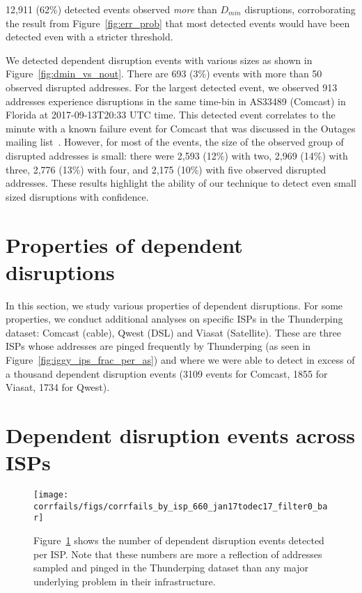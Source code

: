12,911 (62\%) detected events observed \emph{more} than $D_{min}$
disruptions, corroborating the result from Figure~\ref{fig:err_prob}
that most detected events would have been detected even with a
stricter threshold. 

We detected dependent disruption events with various sizes as shown in
Figure~\ref{fig:dmin_vs_nout}. There are
693 (3\%) events with more than 50 observed disrupted addresses. For the largest
detected event, we observed 913 addresses experience disruptions in
the same time-bin in AS33489 (Comcast) in
Florida at 2017-09-13T20:33 UTC time. This detected event correlates
to the minute with a known failure event for Comcast
that was discussed in the Outages mailing list~\cite{comcast-sep-13-2017-large-outage-mailinglist}. However, for most of the events, the size of the observed
group of disrupted addresses is small: there were 2,593 (12\%)
with two, 2,969 (14\%) with three, 2,776 (13\%) with four, and 2,175
(10\%) with five observed disrupted addresses. These results highlight the
ability of our technique to detect even small sized disruptions with
confidence.


\section{Properties of dependent disruptions}

In this section, we study various properties of dependent
disruptions. For some properties, we conduct additional analyses on
specific ISPs in the Thunderping dataset: Comcast (cable), Qwest (DSL)
and Viasat (Satellite). These are three ISPs whose addresses are
pinged frequently by Thunderping (as seen in
Figure~\ref{fig:iggy_ips_frac_per_as})
and where we were able to
detect in excess of a thousand dependent disruption events (3109
events for Comcast, 1855 for Viasat, 1734 for Qwest).

\section{Dependent disruption events across ISPs}

\label{sec:corrfails_by_isp}


\begin{figure}[t]
\centering
\texttt{[image: corrfails/figs/corrfails\_by\_isp\_660\_jan17todec17\_filter0\_bar]}
\caption[Dependent disruption events detected per ISP]{
\label{fig:corrfails_across_isps}
Figure~\ref{fig:corrfails_across_isps} shows the number of
dependent disruption events detected per ISP. Note that these numbers
are more a reflection of addresses sampled and pinged in the
Thunderping dataset than any major underlying problem in their
infrastructure.}
\end{figure}

